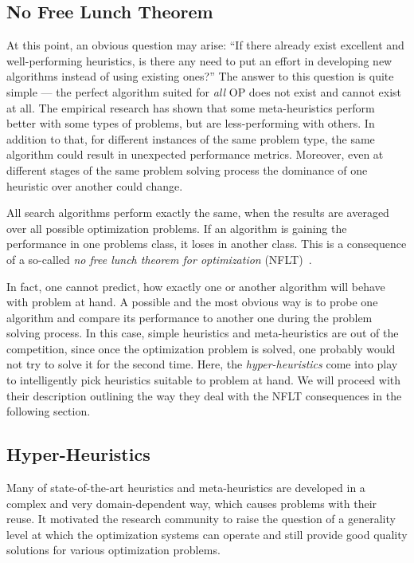 \subsection{No Free Lunch Theorem}
At this point, an obvious question may arise: ``If there already exist excellent and well-performing heuristics, is there any need to put an effort in developing new algorithms instead of using existing ones?'' The answer to this question is quite simple — the perfect algorithm suited for \emph{all} OP does not exist and cannot exist at all. 
The empirical research has shown that some meta-heuristics perform better with some types of problems, but are less-performing with others. In addition to that, for different instances of the same problem type, the same algorithm could result in unexpected performance metrics. Moreover, even at different stages of the same problem solving process the dominance of one heuristic over another could change. 

All search algorithms perform exactly the same, when the results are averaged over all possible optimization problems. If an algorithm is gaining the performance in one problems class, it loses in another class. This is a consequence of a so-called \emph{no free lunch theorem for optimization} (NFLT)~\cite{wolpert1997no}.

In fact, one cannot predict, how exactly one or another algorithm will behave with problem at hand. A possible and the most obvious way is to probe one algorithm and compare its performance to another one during the problem solving process. In this case, simple heuristics and meta-heuristics are out of the competition, since once the optimization problem is solved, one probably would not try to solve it for the second time.
Here, the \emph{hyper-heuristics} come into play to intelligently pick heuristics suitable to problem at hand. We will proceed with their description outlining the way they deal with the NFLT consequences in the following section.


\subsection{Hyper-Heuristics}\label{bg: hh}
Many of state-of-the-art heuristics and meta-heuristics are developed in a complex and very domain-dependent way, which causes problems with their reuse. It motivated the research community to raise the question of a generality level at which the optimization systems can operate and still provide good quality solutions for various optimization problems. 

